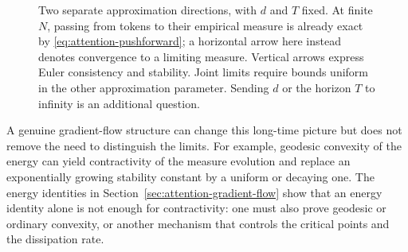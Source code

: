\documentclass[11pt]{amsart}
\numberwithin{equation}{section}
\theoremstyle{plain}
\DeclareMathOperator{\diver}{div}
\DeclareMathOperator{\Id}{Id}
\begin{document}
\begin{figure}[htbp]
\centering
{}
\caption{Two separate approximation directions, with $d$ and $T$
fixed.  At finite $N$, passing from tokens to their empirical measure is
already exact by \eqref{eq:attention-pushforward}; a horizontal arrow here
instead denotes convergence to a limiting measure.  Vertical arrows express
Euler consistency and stability.  Joint limits require bounds uniform in
the other approximation parameter.  Sending $d$ or the horizon $T$ to
infinity is an additional question.}
\label{fig:ips-two-limits}
\end{figure}

A genuine gradient-flow structure can change this long-time picture but
does not remove the need to distinguish the limits.  For example, geodesic
convexity of the energy can yield contractivity of the measure evolution and
replace an exponentially growing stability constant by a uniform or decaying
one.  The energy identities in Section~\ref{sec:attention-gradient-flow} show
that an energy identity alone is not enough for contractivity: one must
also prove geodesic or ordinary convexity, or another mechanism that controls
the critical points and the dissipation rate.
\end{document}
